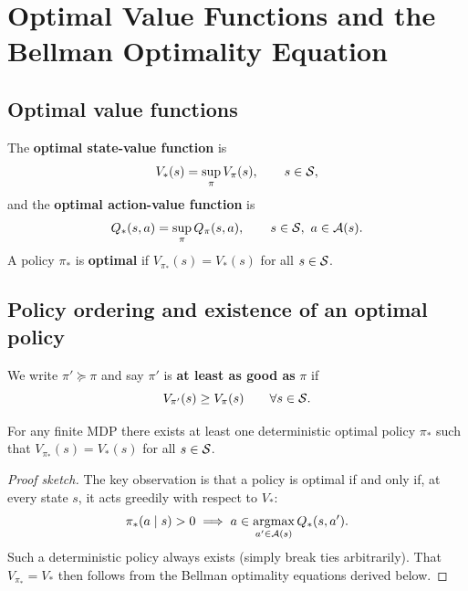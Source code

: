 \section{Optimal Value Functions and the Bellman Optimality Equation}
\label{sec:bellman-optimality}

\subsection*{Optimal value functions}

\begin{definition}
\label{def:optimal-value}
The \textbf{optimal state-value function} is
\begin{equation}
\label{eq:v-star}
V_*(s) = \sup_\pi V_\pi(s), \qquad s \in \mathcal{S},
\end{equation}
and the \textbf{optimal action-value function} is
\begin{equation}
\label{eq:q-star}
Q_*(s, a) = \sup_\pi Q_\pi(s, a), \qquad s \in \mathcal{S},\ a \in \mathcal{A}(s).
\end{equation}
A policy $\pi_*$ is \textbf{optimal} if $V_{\pi_*}(s) = V_*(s)$ for all $s \in \mathcal{S}$.
\end{definition}

\subsection*{Policy ordering and existence of an optimal policy}

\begin{definition}
\label{def:policy-ordering}
We write $\pi' \succeq \pi$ and say $\pi'$ is \textbf{at least as good as} $\pi$ if
\[
V_{\pi'}(s) \ge V_\pi(s) \qquad \forall s \in \mathcal{S}.
\]
\end{definition}

\begin{theorem}
\label{thm:optimal-policy-exists}
For any finite MDP there exists at least one deterministic optimal policy $\pi_*$ such that $V_{\pi_*}(s) = V_*(s)$ for all $s \in \mathcal{S}$.
\end{theorem}

\begin{proof}[Proof sketch]
The key observation is that a policy is optimal if and only if, at every state $s$, it acts greedily with respect to $V_*$:
\[
\pi_*(a \mid s) > 0 \implies a \in \operatorname*{argmax}_{a' \in \mathcal{A}(s)} Q_*(s, a').
\]
Such a deterministic policy always exists (simply break ties arbitrarily). That $V_{\pi_*} = V_*$ then follows from the Bellman optimality equations derived below.
\end{proof}

